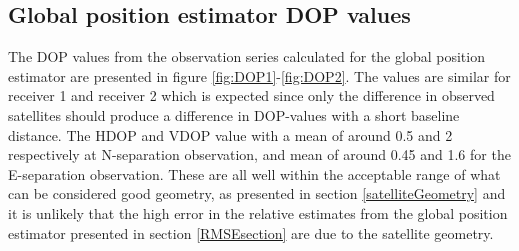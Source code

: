 \subsection{Global position estimator DOP values} \label{ch:globalDOP}
The DOP values from the observation series calculated for the global position estimator are presented in figure \ref{fig:DOP1}-\ref{fig:DOP2}. The values are similar for receiver 1 and receiver 2 which is expected since only the difference in observed satellites should produce a difference in DOP-values with a short baseline distance. The HDOP and VDOP value with a mean of around 0.5 and 2 respectively at N-separation observation, and mean of around 0.45 and 1.6 for the E-separation observation. These are all well within the acceptable range of what can be considered good geometry, as presented in section \ref{satelliteGeometry} and it is unlikely that the high error in the relative estimates from the global position estimator presented in section \ref{RMSEsection} are due to the satellite geometry.

